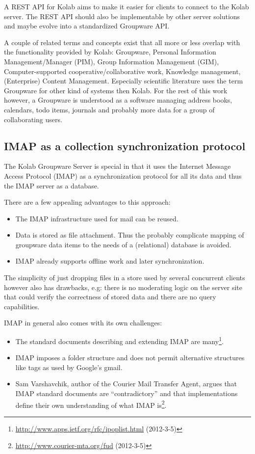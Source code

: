 \documentclass[12pt,a4paper,twoside]{scrartcl}		%
\newcommand{\citeurl}[2]{\url{#1} (#2)}
\begin{document}
A REST API for Kolab aims to make it easier for clients to connect to the Kolab
server. The REST API should also be implementable by other server solutions and
maybe evolve into a standardized Groupware API.

A couple of related terms and concepts exist that all more or less overlap with
the functionality provided by Kolab: Groupware, Personal Information
Management/Manager (PIM), Group Information Management (GIM), Computer-supported
cooperative/collaborative work, Knowledge management, (Enterprise) Content
Management. Especially scientific literature uses the term Groupware for other
kind of systems then Kolab\cite[sec. 2.1]{Stoermer2004}. For the rest of this
work however, a Groupware is understood as a software managing address books,
calendars, todo items, journals and probably more data for a group of
collaborating users.

\subsection{IMAP as a collection synchronization protocol}
\label{sec:imap-as-collection}

The Kolab Groupware Server is special in that it uses the Internet Message
Access Protocol (IMAP) as a synchronization protocol for all its data and thus
the IMAP server as a database.

There are a few appealing advantages to this approach:

\begin{itemize}
  \item The IMAP infrastructure used for mail can be reused.
  \item Data is stored as file attachment. Thus the probably complicate mapping of
  groupware data items to the needs of a (relational) database is avoided.
  \item IMAP already supports offline work and later synchronization.
\end{itemize}

The simplicity of just dropping files in a store used by several concurrent
clients however also has drawbacks, e.g: there is no moderating logic on the
server site that could verify the correctness of stored data and there are no
query capabilities.

IMAP in general also comes with its own challenges:

\begin{itemize}
\item The standard documents describing and extending IMAP are
  many\footnote{\citeurl{http://www.apps.ietf.org/rfc/ipoplist.html}{2012-3-5}}.
\item IMAP imposes a folder structure and does not permit alternative structures
  like tags as used by Google's gmail.
\item Sam Varshavchik, author of the Courier Mail Transfer Agent, argues that
  IMAP standard documents are ``contradictory'' and that implementations define
  their own understanding of what IMAP
  is\footnote{\citeurl{http://www.courier-mta.org/fud}{2012-3-5}}.
\end{itemize}
\end{document}
